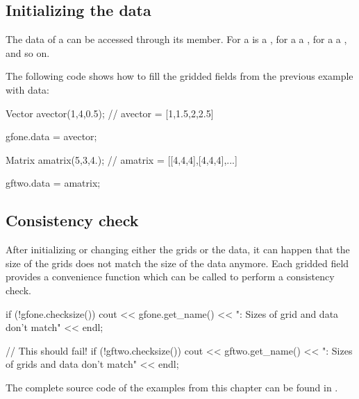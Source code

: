 \subsection{Initializing the data}
\label{sec:griddedfields:initdata}

The data of a  can be accessed through its  member.
For a   is a , for a  a , for a  a , and so on.

The following code shows how to fill the gridded fields from the previous example with data:

\begin{code}
Vector avector(1,4,0.5);    // avector = [1,1.5,2,2.5]

gfone.data = avector;

Matrix amatrix(5,3,4.);     // amatrix = [[4,4,4],[4,4,4],...]

gftwo.data = amatrix;
\end{code}

\subsection{Consistency check}
\label{sec:griddedfields:consistency}

After initializing or changing either the grids or the data, it can happen
that the size of the grids does not match the size of the data anymore. Each
gridded field provides a convenience function which can be called to perform a
consistency check.

\begin{code}
if (!gfone.checksize())
  cout << gfone.get_name()
       << ": Sizes of grid and data don't match" << endl;

// This should fail!
if (!gftwo.checksize())
  cout << gftwo.get_name()
       << ": Sizes of grids and data don't match" << endl;
\end{code}

The complete source code of the examples from this chapter can be found in
.


